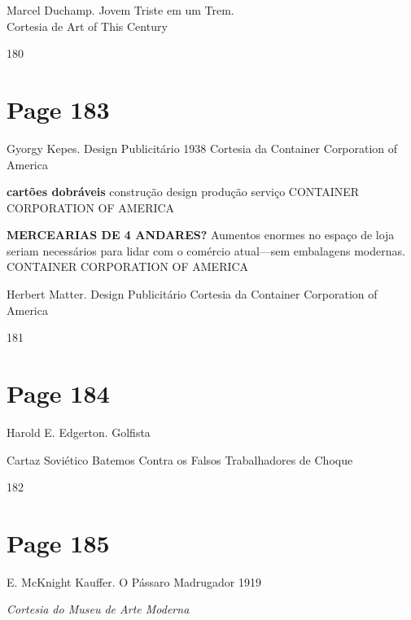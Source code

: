 \documentclass[a4paper]{article}
\begin{document}
\bigskip

Marcel Duchamp. Jovem Triste em um Trem.\\
Cortesia de Art of This Century

\vfill
\begin{center}
180
\end{center}

\newpage
\section*{Page 183}

\raggedright

Gyorgy Kepes. Design Publicitário 1938
Cortesia da Container Corporation of America

\par %

\textbf{cartões dobráveis}
construção
design
produção
serviço
CONTAINER CORPORATION OF AMERICA

\par %

\textbf{MERCEARIAS DE 4 ANDARES?}
Aumentos enormes no espaço de loja seriam necessários para lidar com o comércio atual---sem embalagens modernas.
CONTAINER CORPORATION OF AMERICA

\par %

Herbert Matter. Design Publicitário
Cortesia da Container Corporation of America

\vfill
\null\hfill 181

\newpage
\section*{Page 184}

Harold E. Edgerton. Golfista

Cartaz Soviético
Batemos
Contra os Falsos Trabalhadores de Choque

182

\newpage
\section*{Page 185}

E. McKnight Kauffer. O Pássaro Madrugador 1919

\textit{Cortesia do Museu de Arte Moderna}
\end{document}

